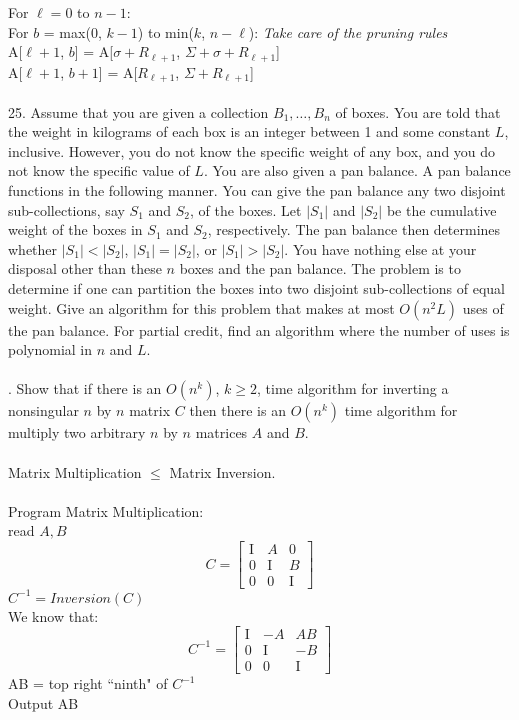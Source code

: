 \documentclass[10pt]{article}
\newcommand{\tab}{\hspace*{2em}}
\newcommand{\tabb}{\hspace*{4em}}
\begin{document}
		For $\ell = 0$ to $n-1$:\\
		\tab For $b$ = max($0$, $k-1$) to min($k$, $n-\ell$): \emph{Take care of the pruning rules}\\
		\tabb A[$\ell+1$, $b$] = A[$\sigma + R_{\ell+1}$, $\Sigma + \sigma + R_{\ell+1}$]\\
		\tabb A[$\ell+1$, $b+1$] = A[$R_{\ell+1}$, $\Sigma + R_{\ell+1}$]\\
		\\
	25.	Assume that you are given a collection $B_1 , \ldots, B_n$ of boxes. You are told that the weight in kilograms
		of each box is an integer between 1 and some constant $L$, inclusive. However, you do not know the
		specific weight of any box, and you do not know the specific value of $L$. You are also given a pan
		balance. A pan balance functions in the following manner. You can give the pan balance any two
		disjoint sub-collections, say $S_1$ and $S_2$, of the boxes. Let $|S_1|$ and $|S_2|$ be the cumulative weight of the
		boxes in $S_1$ and $S_2$, respectively. The pan balance then determines whether $|S_1| < |S_2|$, $|S_1| = |S_2|$,
		or $|S_1| > |S_2|$. You have nothing else at your disposal other than these $n$ boxes and the pan balance.
		The problem is to determine if one can partition the boxes into two disjoint sub-collections of equal
		weight. Give an algorithm for this problem that makes at most $O(n^2 L)$ uses of the pan balance. For
		partial credit, find an algorithm where the number of uses is polynomial in $n$ and $L$.\\
		\\
		.	Show that if there is an $O(n^k )$, $k \geq 2$, time algorithm for inverting a nonsingular $n$ by $n$ matrix $C$
		then there is an $O(n^k)$ time algorithm for multiply two arbitrary $n$ by $n$ matrices $A$ and $B$.\\
		\\
		Matrix Multiplication $\leq$ Matrix Inversion.\\
		\\
		Program Matrix Multiplication:\\
		\tab read $A,B$\\
		\tab \[
		C =
		\left[
		\begin{array}{ccc}
			\mathrm{I} & A & 0\\
			0 & \mathrm{I} & B\\
			0 & 0 & \mathrm{I}
		\end{array} 
		\right]
		\]
		\tab $C^{-1} = Inversion(C)$\\
		\tab We know that:\\ 
		\[
		C^{-1} =
		\left[
		\begin{array}{ccc}
			\mathrm{I} & -A & AB\\
			0 & \mathrm{I} & -B\\
			0 & 0 & \mathrm{I}
		\end{array} 
		\right]
		\]
		\tab AB = top right ``ninth" of $C^{-1}$\\
		\tab Output AB
\end{document}
